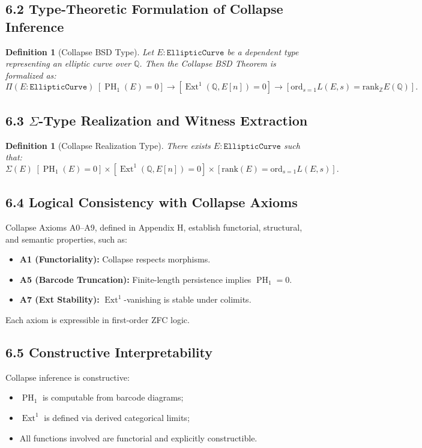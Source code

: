 \documentclass[11pt]{article}
\newtheorem{definition}[theorem]{Definition}
\DeclareMathOperator{\Ext}{Ext}
\DeclareMathOperator{\PH}{PH}
\newcommand{\QQ}{\mathbb{Q}}
\newcommand{\ZZ}{\mathbb{Z}}
\begin{document}
\subsection{6.2 Type-Theoretic Formulation of Collapse Inference}

\begin{definition}[Collapse BSD Type]
\label{def:collapse-bsd-type}
Let $E : \texttt{EllipticCurve}$ be a dependent type representing an elliptic curve over $\QQ$.  
Then the Collapse BSD Theorem is formalized as:
\[
\Pi (E : \texttt{EllipticCurve})\; 
[\PH_1(E) = 0] \to [\Ext^1(\QQ,E[n]) = 0] \to [\mathrm{ord}_{s=1} L(E,s) = \mathrm{rank}_{\ZZ} E(\QQ)].
\]
\end{definition}

\subsection{6.3 $\Sigma$-Type Realization and Witness Extraction}

\begin{definition}[Collapse Realization Type]
There exists $E : \texttt{EllipticCurve}$ such that:
\[
\Sigma (E)\; 
[\PH_1(E) = 0] \times [\Ext^1(\QQ,E[n]) = 0] \times [\mathrm{rank}(E) = \mathrm{ord}_{s=1} L(E,s)].
\]
\end{definition}

\subsection{6.4 Logical Consistency with Collapse Axioms}

Collapse Axioms A0–A9, defined in Appendix H, establish functorial, structural, and semantic properties, such as:
\begin{itemize}
  \item \textbf{A1 (Functoriality):} Collapse respects morphisms.
  \item \textbf{A5 (Barcode Truncation):} Finite-length persistence implies $\PH_1 = 0$.
  \item \textbf{A7 (Ext Stability):} $\Ext^1$-vanishing is stable under colimits.
\end{itemize}
Each axiom is expressible in first-order ZFC logic.

\subsection{6.5 Constructive Interpretability}

Collapse inference is constructive:
\begin{itemize}
  \item $\PH_1$ is computable from barcode diagrams;
  \item $\Ext^1$ is defined via derived categorical limits;
  \item All functions involved are functorial and explicitly constructible.
\end{itemize}
\end{document}
